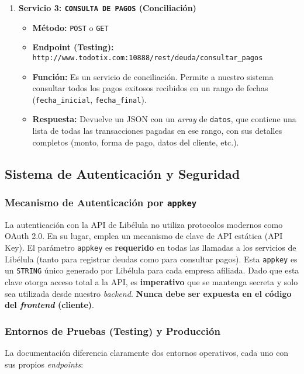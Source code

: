 \begin{enumerate}
            \item \textbf{Servicio 3: \texttt{CONSULTA DE PAGOS} (Conciliación)}
            \begin{itemize}
                \item \textbf{Método:} \texttt{POST} o \texttt{GET}
                \item \textbf{Endpoint (Testing):} \texttt{http://www.todotix.com:10888/rest/deuda/consultar\_pagos}
                \item \textbf{Función:} Es un servicio de conciliación. Permite a nuestro sistema consultar todos los pagos exitosos recibidos en un rango de fechas (\texttt{fecha\_inicial}, \texttt{fecha\_final}).
                \item \textbf{Respuesta:} Devuelve un JSON con un \emph{array} de \texttt{datos}, que contiene una lista de todas las transacciones pagadas en ese rango, con sus detalles completos (monto, forma de pago, datos del cliente, etc.).
            \end{itemize}
        \end{enumerate}

    \subsection{Sistema de Autenticación y Seguridad}

        \subsubsection{Mecanismo de Autenticación por \texttt{appkey}}
            La autenticación con la API de Libélula no utiliza protocolos modernos como OAuth 2.0. En su lugar, emplea un mecanismo 
            de clave de API estática (API Key).
            El parámetro \texttt{appkey} es \textbf{requerido} en todas las llamadas a los servicios de Libélula (tanto para 
            registrar deudas como para consultar pagos).
            Esta \texttt{appkey} es un \texttt{STRING} único generado por Libélula para cada empresa afiliada. Dado que esta clave 
            otorga acceso total a la API, es \textbf{imperativo} que se mantenga secreta y solo sea utilizada desde nuestro 
            \emph{backend}. \textbf{Nunca debe ser expuesta en el código del \emph{frontend} (cliente)}.\par

        \subsubsection{Entornos de Pruebas (Testing) y Producción}
            La documentación diferencia claramente dos entornos operativos, cada uno con sus propios \emph{endpoints}:\par

